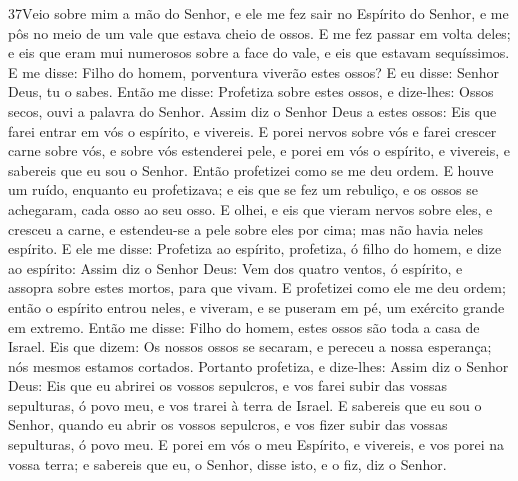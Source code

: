 \medskip

\lettrine{37} Veio sobre mim a mão do Senhor, e ele me fez
sair no Espírito do Senhor, e me pôs no meio de um vale que estava
cheio de ossos. E me fez passar em volta deles; e eis que eram
mui numerosos sobre a face do vale, e eis que estavam sequíssimos.
E me disse: Filho do homem, porventura viverão estes ossos? E eu
disse: Senhor Deus, tu o sabes. Então me disse: Profetiza sobre
estes ossos, e dize-lhes: Ossos secos, ouvi a palavra do Senhor.
Assim diz o Senhor Deus a estes ossos: Eis que farei entrar em
vós o espírito, e vivereis. E porei nervos sobre vós e farei
crescer carne sobre vós, e sobre vós estenderei pele, e porei em vós
o espírito, e vivereis, e sabereis que eu sou o Senhor. Então
profetizei como se me deu ordem. E houve um ruído, enquanto eu
profetizava; e eis que se fez um rebuliço, e os ossos se achegaram,
cada osso ao seu osso. E olhei, e eis que vieram nervos sobre
eles, e cresceu a carne, e estendeu-se a pele sobre eles por cima;
mas não havia neles espírito. E ele me disse: Profetiza ao
espírito, profetiza, ó filho do homem, e dize ao espírito: Assim diz
o Senhor Deus: Vem dos quatro ventos, ó espírito, e assopra sobre
estes mortos, para que vivam. E profetizei como ele me deu
ordem; então o espírito entrou neles, e viveram, e se puseram em pé,
um exército grande em extremo. Então me disse: Filho do
homem, estes ossos são toda a casa de Israel. Eis que dizem: Os
nossos ossos se secaram, e pereceu a nossa esperança; nós mesmos
estamos cortados. Portanto profetiza, e dize-lhes: Assim diz
o Senhor Deus: Eis que eu abrirei os vossos sepulcros, e vos farei
subir das vossas sepulturas, ó povo meu, e vos trarei à terra de
Israel. E sabereis que eu sou o Senhor, quando eu abrir os
vossos sepulcros, e vos fizer subir das vossas sepulturas, ó povo
meu. E porei em vós o meu Espírito, e vivereis, e vos porei
na vossa terra; e sabereis que eu, o Senhor, disse isto, e o fiz,
diz o Senhor.

